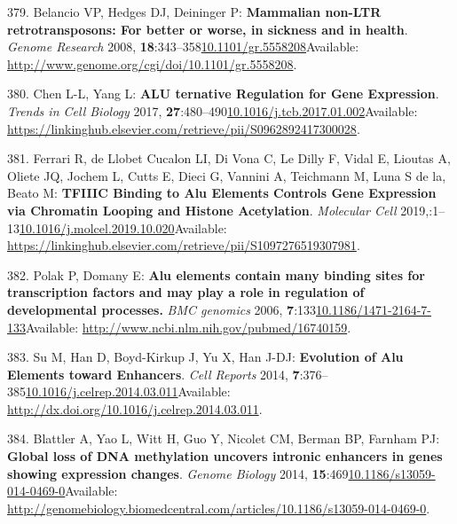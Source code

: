 \documentclass[
]{book}
\begin{document}
\leavevmode\hypertarget{ref-Belancio2008}{}%
379. Belancio VP, Hedges DJ, Deininger P: \textbf{Mammalian non-LTR retrotransposons: For better or worse, in sickness and in health}. \emph{Genome Research} 2008, \textbf{18}:343--358\href{https://doi.org/10.1101/gr.5558208}{10.1101/gr.5558208}Available: \url{http://www.genome.org/cgi/doi/10.1101/gr.5558208}.

\leavevmode\hypertarget{ref-Chen2017b}{}%
380. Chen L-L, Yang L: \textbf{ALU ternative Regulation for Gene Expression}. \emph{Trends in Cell Biology} 2017, \textbf{27}:480--490\href{https://doi.org/10.1016/j.tcb.2017.01.002}{10.1016/j.tcb.2017.01.002}Available: \url{https://linkinghub.elsevier.com/retrieve/pii/S0962892417300028}.

\leavevmode\hypertarget{ref-RobertoFerrari2019}{}%
381. Ferrari R, de Llobet Cucalon LI, Di Vona C, Le Dilly F, Vidal E, Lioutas A, Oliete JQ, Jochem L, Cutts E, Dieci G, Vannini A, Teichmann M, Luna S de la, Beato M: \textbf{TFIIIC Binding to Alu Elements Controls Gene Expression via Chromatin Looping and Histone Acetylation}. \emph{Molecular Cell} 2019,:1--13\href{https://doi.org/10.1016/j.molcel.2019.10.020}{10.1016/j.molcel.2019.10.020}Available: \url{https://linkinghub.elsevier.com/retrieve/pii/S1097276519307981}.

\leavevmode\hypertarget{ref-Polak2006}{}%
382. Polak P, Domany E: \textbf{Alu elements contain many binding sites for transcription factors and may play a role in regulation of developmental processes.} \emph{BMC genomics} 2006, \textbf{7}:133\href{https://doi.org/10.1186/1471-2164-7-133}{10.1186/1471-2164-7-133}Available: \url{http://www.ncbi.nlm.nih.gov/pubmed/16740159}.

\leavevmode\hypertarget{ref-Su2014}{}%
383. Su M, Han D, Boyd-Kirkup J, Yu X, Han J-DJ: \textbf{Evolution of Alu Elements toward Enhancers}. \emph{Cell Reports} 2014, \textbf{7}:376--385\href{https://doi.org/10.1016/j.celrep.2014.03.011}{10.1016/j.celrep.2014.03.011}Available: \url{http://dx.doi.org/10.1016/j.celrep.2014.03.011}.

\leavevmode\hypertarget{ref-Blattler2014}{}%
384. Blattler A, Yao L, Witt H, Guo Y, Nicolet CM, Berman BP, Farnham PJ: \textbf{Global loss of DNA methylation uncovers intronic enhancers in genes showing expression changes}. \emph{Genome Biology} 2014, \textbf{15}:469\href{https://doi.org/10.1186/s13059-014-0469-0}{10.1186/s13059-014-0469-0}Available: \url{http://genomebiology.biomedcentral.com/articles/10.1186/s13059-014-0469-0}.
\end{document}
